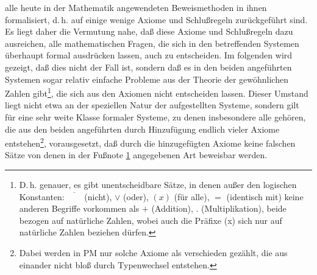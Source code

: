 \documentclass[draft]{scrartcl}
\newcounter{commentaryNumber}
\begin{document}
alle heute in der Mathematik angewendeten
Beweismethoden in ihnen formalisiert, d.\,h. auf
einige wenige Axiome und Schlußregeln zurückgeführt sind.
Es liegt daher die Vermutung nahe, daß diese Axiome
und Schlußregeln dazu ausreichen, alle mathematischen
Fragen, die sich in den betreffenden Systemen überhaupt
formal ausdrücken lassen, auch zu entscheiden. Im folgenden
wird gezeigt, daß dies nicht der Fall ist, sondern daß
es in den beiden angeführten Systemen sogar relativ
einfache Probleme aus der Theorie der gewöhnlichen Zahlen
gibt\footnote{\label{fussnote4}D.\,h. genauer, es gibt unentscheidbare
Sätze, in denen außer den logischen Konstanten:
$\overline{\phantom{XX}}$ (nicht), $\lor$ (oder),
$\left(x\right)$ (für alle), $=$ (identisch mit) keine anderen
Begriffe vorkommen als $+$ (Addition), $.$
(Multiplikation), beide bezogen auf natürliche Zahlen,
wobei auch die Präfixe (x) sich nur auf natürliche Zahlen beziehen dürfen.}, die sich aus den Axiomen nicht
entscheiden lassen. Dieser Umstand liegt nicht etwa
an der speziellen Natur der aufgestellten Systeme,
sondern gilt für eine sehr weite Klasse formaler Systeme,
zu denen insbesondere alle gehören, die aus den beiden
angeführten durch Hinzufügung endlich vieler Axiome
entstehen\footnote{Dabei werden in PM nur solche Axiome
als verschieden gezählt, die aus einander nicht bloß
durch Typenwechsel entstehen.}, vorausgesetzt, daß
durch die hinzugefügten Axiome keine falschen Sätze
von denen in der Fußnote \ref{fussnote4} angegebenen
Art beweisbar werden.
\end{document}
